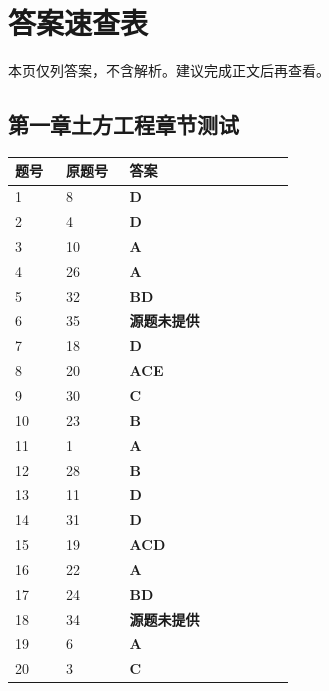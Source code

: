 \documentclass[UTF8,fontset=windows,11pt]{ctexart}
\begin{document}
\newpage
\section*{答案速查表}
{\small\textcolor{examgray}{本页仅列答案，不含解析。建议完成正文后再查看。}}\par
\vspace{0.6em}
\subsection*{第一章土方工程章节测试}
\begin{longtable}{p{0.16\linewidth}p{0.2\linewidth}p{0.52\linewidth}}
\textbf{\textcolor{examnavy}{题号}} & \textbf{\textcolor{examnavy}{原题号}} & \textbf{\textcolor{answergreen}{答案}} \\
\hline
1 & 8 & \textbf{\textcolor{answergreen}{D}} \\
2 & 4 & \textbf{\textcolor{answergreen}{D}} \\
3 & 10 & \textbf{\textcolor{answergreen}{A}} \\
4 & 26 & \textbf{\textcolor{answergreen}{A}} \\
5 & 32 & \textbf{\textcolor{answergreen}{BD}} \\
6 & 35 & \textbf{\textcolor{answergreen}{源题未提供}} \\
7 & 18 & \textbf{\textcolor{answergreen}{D}} \\
8 & 20 & \textbf{\textcolor{answergreen}{ACE}} \\
9 & 30 & \textbf{\textcolor{answergreen}{C}} \\
10 & 23 & \textbf{\textcolor{answergreen}{B}} \\
11 & 1 & \textbf{\textcolor{answergreen}{A}} \\
12 & 28 & \textbf{\textcolor{answergreen}{B}} \\
13 & 11 & \textbf{\textcolor{answergreen}{D}} \\
14 & 31 & \textbf{\textcolor{answergreen}{D}} \\
15 & 19 & \textbf{\textcolor{answergreen}{ACD}} \\
16 & 22 & \textbf{\textcolor{answergreen}{A}} \\
17 & 24 & \textbf{\textcolor{answergreen}{BD}} \\
18 & 34 & \textbf{\textcolor{answergreen}{源题未提供}} \\
19 & 6 & \textbf{\textcolor{answergreen}{A}} \\
20 & 3 & \textbf{\textcolor{answergreen}{C}} \\

\end{longtable}
\end{document}
